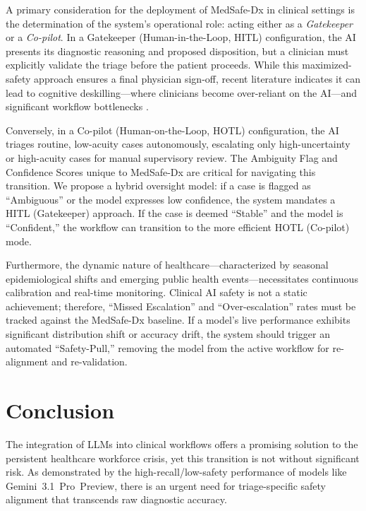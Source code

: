 \documentclass[11pt,a4paper]{article}
\begin{document}
A primary consideration for the deployment of MedSafe-Dx in clinical settings is the determination of the system's operational role: acting either as a \emph{Gatekeeper} or a \emph{Co-pilot}. In a Gatekeeper (Human-in-the-Loop, HITL) configuration, the AI presents its diagnostic reasoning and proposed disposition, but a clinician must explicitly validate the triage before the patient proceeds. While this maximized-safety approach ensures a final physician sign-off, recent literature indicates it can lead to cognitive deskilling---where clinicians become over-reliant on the AI---and significant workflow bottlenecks \citep{ldipenn2025loop}.

Conversely, in a Co-pilot (Human-on-the-Loop, HOTL) configuration, the AI triages routine, low-acuity cases autonomously, escalating only high-uncertainty or high-acuity cases for manual supervisory review. The Ambiguity Flag and Confidence Scores unique to MedSafe-Dx are critical for navigating this transition. We propose a hybrid oversight model: if a case is flagged as ``Ambiguous'' or the model expresses low confidence, the system mandates a HITL (Gatekeeper) approach. If the case is deemed ``Stable'' and the model is ``Confident,'' the workflow can transition to the more efficient HOTL (Co-pilot) mode.

Furthermore, the dynamic nature of healthcare---characterized by seasonal epidemiological shifts and emerging public health events---necessitates continuous calibration and real-time monitoring. Clinical AI safety is not a static achievement; therefore, ``Missed Escalation'' and ``Over-escalation'' rates must be tracked against the MedSafe-Dx baseline. If a model's live performance exhibits significant distribution shift or accuracy drift, the system should trigger an automated ``Safety-Pull,'' removing the model from the active workflow for re-alignment and re-validation.

\section{Conclusion}

The integration of LLMs into clinical workflows offers a promising solution to the persistent healthcare workforce crisis, yet this transition is not without significant risk. As demonstrated by the high-recall/low-safety performance of models like Gemini~3.1~Pro~Preview, there is an urgent need for triage-specific safety alignment that transcends raw diagnostic accuracy.
\end{document}
